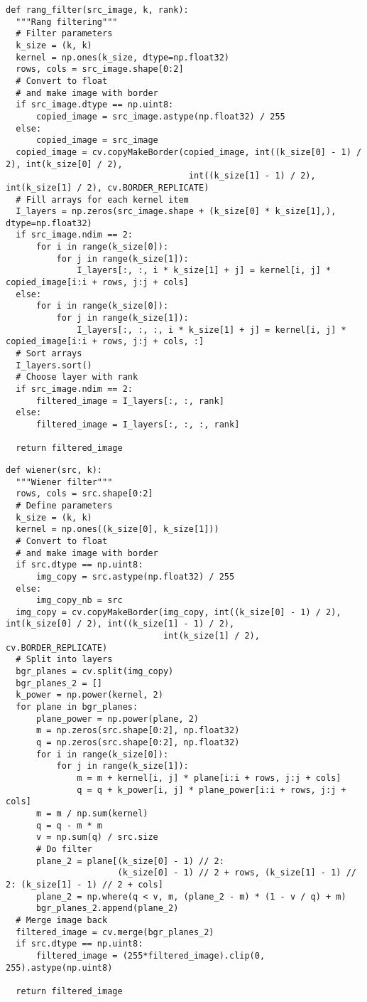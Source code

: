 \documentclass[a4paper, 12pt]{extarticle}
\begin{document}
\begin{lstlisting}[style=python_white]
def rang_filter(src_image, k, rank):
  """Rang filtering"""
  # Filter parameters
  k_size = (k, k)
  kernel = np.ones(k_size, dtype=np.float32)
  rows, cols = src_image.shape[0:2]
  # Convert to float
  # and make image with border
  if src_image.dtype == np.uint8:
      copied_image = src_image.astype(np.float32) / 255
  else:
      copied_image = src_image
  copied_image = cv.copyMakeBorder(copied_image, int((k_size[0] - 1) / 2), int(k_size[0] / 2),
                                    int((k_size[1] - 1) / 2), int(k_size[1] / 2), cv.BORDER_REPLICATE)
  # Fill arrays for each kernel item
  I_layers = np.zeros(src_image.shape + (k_size[0] * k_size[1],), dtype=np.float32)
  if src_image.ndim == 2:
      for i in range(k_size[0]):
          for j in range(k_size[1]):
              I_layers[:, :, i * k_size[1] + j] = kernel[i, j] * copied_image[i:i + rows, j:j + cols]
  else:
      for i in range(k_size[0]):
          for j in range(k_size[1]):
              I_layers[:, :, :, i * k_size[1] + j] = kernel[i, j] * copied_image[i:i + rows, j:j + cols, :]
  # Sort arrays
  I_layers.sort()
  # Choose layer with rank
  if src_image.ndim == 2:
      filtered_image = I_layers[:, :, rank]
  else:
      filtered_image = I_layers[:, :, :, rank]

  return filtered_image
\end{lstlisting}

\begin{lstlisting}[style=python_white]
def wiener(src, k):
  """Wiener filter"""
  rows, cols = src.shape[0:2]
  # Define parameters
  k_size = (k, k)
  kernel = np.ones((k_size[0], k_size[1]))
  # Convert to float
  # and make image with border
  if src.dtype == np.uint8:
      img_copy = src.astype(np.float32) / 255
  else:
      img_copy_nb = src
  img_copy = cv.copyMakeBorder(img_copy, int((k_size[0] - 1) / 2), int(k_size[0] / 2), int((k_size[1] - 1) / 2),
                               int(k_size[1] / 2), cv.BORDER_REPLICATE)
  # Split into layers
  bgr_planes = cv.split(img_copy)
  bgr_planes_2 = []
  k_power = np.power(kernel, 2)
  for plane in bgr_planes:
      plane_power = np.power(plane, 2)
      m = np.zeros(src.shape[0:2], np.float32)
      q = np.zeros(src.shape[0:2], np.float32)
      for i in range(k_size[0]):
          for j in range(k_size[1]):
              m = m + kernel[i, j] * plane[i:i + rows, j:j + cols]
              q = q + k_power[i, j] * plane_power[i:i + rows, j:j + cols]
      m = m / np.sum(kernel)
      q = q - m * m
      v = np.sum(q) / src.size
      # Do filter
      plane_2 = plane[(k_size[0] - 1) // 2:
                      (k_size[0] - 1) // 2 + rows, (k_size[1] - 1) // 2: (k_size[1] - 1) // 2 + cols]
      plane_2 = np.where(q < v, m, (plane_2 - m) * (1 - v / q) + m)
      bgr_planes_2.append(plane_2)
  # Merge image back
  filtered_image = cv.merge(bgr_planes_2)
  if src.dtype == np.uint8:
      filtered_image = (255*filtered_image).clip(0, 255).astype(np.uint8)

  return filtered_image
\end{lstlisting}
\end{document}
